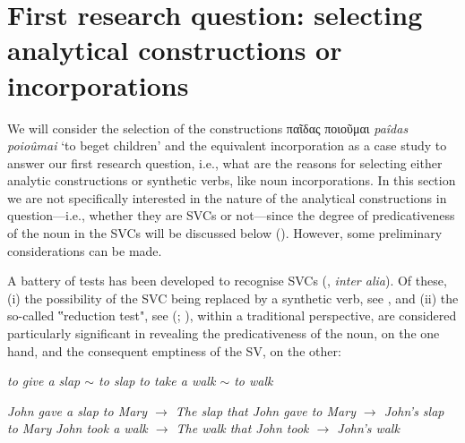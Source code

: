 \documentclass[output=paper,colorlinks,citecolor=brown]{langscibook}
\begin{document}
\section{First research question: selecting analytical constructions or incorporations}\label{Section2}
We will consider the selection of the constructions παῖδας ποιοῦμαι \textit{paîdas poioûmai} `to beget children' and the equivalent incorporation as a case study to answer our first research question, i.e., what are the reasons for selecting either analytic constructions or synthetic verbs, like noun incorporations. In this section we are not specifically interested in the nature of the analytical constructions in question---i.e., whether they are SVCs or not---since the degree of predicativeness of the noun in the SVCs will be discussed below (). However, some preliminary considerations can be made.

A battery of tests has been developed to recognise SVCs (\citealp{langer2004linguistic}, \textit{inter alia}). Of these, (i) the possibility of the SVC being replaced by a synthetic verb, see , and (ii) the so-called ‟reduction test", see  (\citealt[39--43]{Gross1981}; \citealt[28]{giry1987predicats}), within a traditional perspective, are considered particularly significant in revealing the predicativeness of the noun, on the one hand, and the consequent emptiness of the SV, on the other: 


\begin{exe}
	\ex \label{ex:4}
	\begin{xlist}
		\ex \label{ex:4a} \textit{to give a slap $\sim$ to slap}
		\ex \label{ex:4b} \textit{to take a walk $\sim$ to walk}
	\end{xlist}
	\ex \label{ex:5}
	\begin{xlist}
		\ex \textit{John gave a slap to Mary $\rightarrow$ The slap that John gave to Mary $\rightarrow$ John's slap to Mary}
		\ex \textit{John took a walk $\rightarrow$ The walk that John took $\rightarrow$ John's walk}
	\end{xlist}
\end{exe}
\end{document}

